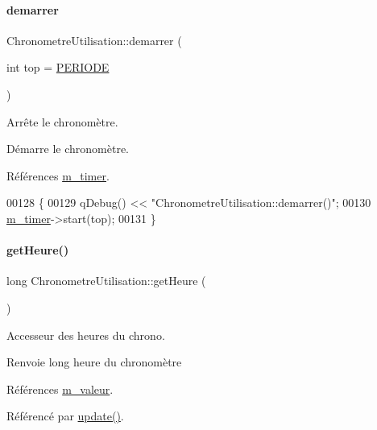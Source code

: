 \paragraph{\texorpdfstring{demarrer}{demarrer}}
{\footnotesize\ttfamily Chronometre\+Utilisation\+::demarrer (\begin{DoxyParamCaption}\item[{int}]{top = {\ttfamily \hyperlink{chronometreutilisation_8h_ad0750d12e2f5f404ec458d4066a53fa4}{P\+E\+R\+I\+O\+DE}} }\end{DoxyParamCaption})\hspace{0.3cm}{\ttfamily [slot]}}

Arrête le chronomètre.

Démarre le chronomètre. 

Références \hyperlink{class_chronometre_utilisation_ae86620ca7d91c0d06c2e695493638bf2}{m\+\_\+timer}.


\begin{DoxyCode}
00128 \{
00129     qDebug() << \textcolor{stringliteral}{"ChronometreUtilisation::demarrer()"};
00130     \hyperlink{class_chronometre_utilisation_ae86620ca7d91c0d06c2e695493638bf2}{m\_timer}->start(top);
00131 \}
\end{DoxyCode}
\mbox{\label{class_chronometre_utilisation_a03c732560e07a2014129a7da8bb2307b}} 
\paragraph{\texorpdfstring{get\+Heure()}{getHeure()}}
{\footnotesize\ttfamily long Chronometre\+Utilisation\+::get\+Heure (\begin{DoxyParamCaption}{ }\end{DoxyParamCaption})}

Accesseur des heures du chrono.

\begin{DoxyReturn}{Renvoie}
long heure du chronomètre 
\end{DoxyReturn}


Références \hyperlink{class_chronometre_utilisation_a7ef8b30ae4b6db56b9be832c847186ea}{m\+\_\+valeur}.



Référencé par \hyperlink{class_chronometre_utilisation_add760c3052342baec482fe0752a89b86}{update()}.


